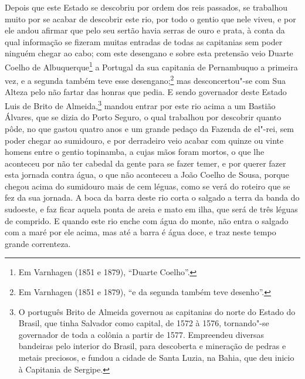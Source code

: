 \begin{linenumbers}
Depois que este Estado se descobriu por ordem dos reis passados, se trabalhou muito por se
acabar de descobrir este rio, por todo o gentio que nele viveu, e por ele andou afirmar
que pelo seu sertão havia serras de ouro e prata, à conta da qual informação se fizeram
muitas entradas de todas as capitanias sem poder ninguém chegar ao cabo; com este
desengano e sobre esta pretensão veio Duarte Coelho de Albuquerque\footnote{ Em Varnhagen
(1851 e 1879), ``Duarte Coelho''.} a Portugal da sua capitania de Pernambuquo a primeira
vez, e a segunda também teve esse desengano;\footnote{ Em Varnhagen (1851 e 1879), ``e da
segunda também teve desenho''.} mas desconcertou"-se com Sua Alteza pelo não fartar das
honras que pedia. E sendo governador deste Estado Luis de Brito de Almeida,\footnote{ O
português Brito de Almeida governou as capitanias do norte do Estado do Brasil, que tinha
Salvador como capital, de 1572 à 1576, tornando"-se governador de toda a colônia a partir
de 1577. Empreendeu diversas bandeiras pelo interior do Brasil, para descoberta e
mineração de pedras e metais preciosos, e fundou a cidade de Santa Luzia, na Bahia, que deu
inicio à Capitania de Sergipe.} mandou entrar por este rio acima a um Bastião Álvares,
que se dizia do Porto Seguro, o qual trabalhou por descobrir quanto pôde, no que gastou
quatro anos e um grande pedaço da Fazenda de el"-rei, sem poder chegar ao sumidouro, e por
derradeiro veio acabar com quinze ou vinte homens entre o gentio topinamba, a cujas mãos
foram mortos, o que lhe aconteceu por não ter cabedal da gente para se fazer temer, e por
querer fazer esta jornada contra água, o que não aconteceu a João Coelho de Sousa, porque
chegou acima do sumidouro mais de cem léguas, como se verá do roteiro que se fez da sua
jornada. A boca da barra deste rio corta o salgado a terra da banda do sudoeste, e faz
ficar aquela ponta de areia e mato em ilha, que será de três léguas de comprido. E quando
este rio enche com água do monte, não entra o salgado com a maré por ele acima, mas até a
barra é água doce, e traz neste tempo grande correnteza.


\end{linenumbers}
